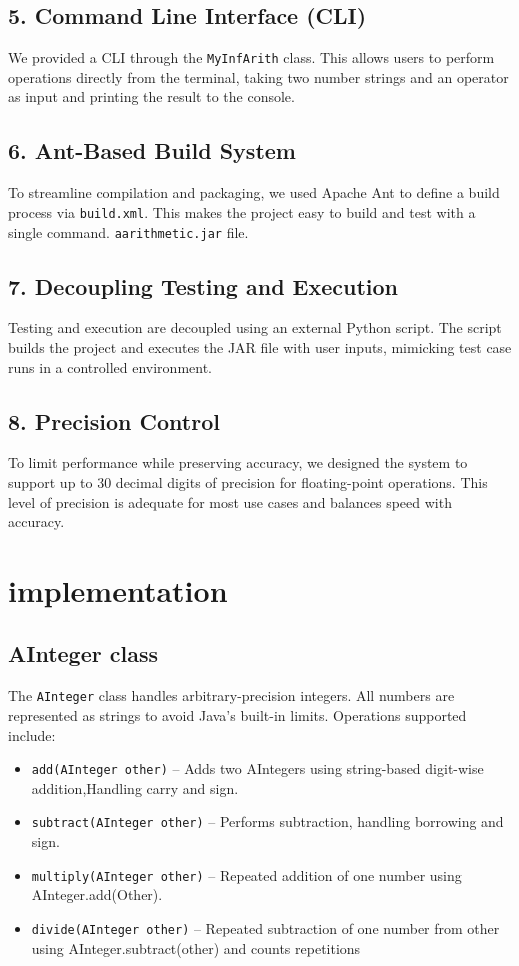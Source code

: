 \documentclass{article}
\begin{document}
\subsection*{5. Command Line Interface (CLI)}
We provided a CLI through the \texttt{MyInfArith} class. This allows users to perform operations directly from the terminal, taking two number strings and an operator as input and printing the result to the console.

\subsection*{6. Ant-Based Build System}
To streamline compilation and packaging, we used Apache Ant to define a build process via \texttt{build.xml}. This makes the project easy to build and test with a single command.
\texttt{aarithmetic.jar} file.

\subsection*{7. Decoupling Testing and Execution}
Testing and execution are decoupled using an external Python script. The script builds the project and executes the JAR file with user inputs, mimicking test case runs in a controlled environment.

\subsection*{8. Precision Control}
To limit performance while preserving accuracy, we designed the system to support up to 30 decimal digits of precision for floating-point operations. This level of precision is adequate for most use cases and balances speed with accuracy.



\section*{implementation}
\subsection*{AInteger class}
The \texttt{AInteger} class handles arbitrary-precision integers. All numbers are represented as strings to avoid Java's built-in limits. Operations supported include:
\begin{itemize}
    \item \texttt{add(AInteger other)} – Adds two AIntegers using string-based digit-wise addition,Handling carry and sign.
    \item \texttt{subtract(AInteger other)} – Performs subtraction, handling borrowing and sign.
    \item \texttt{multiply(AInteger other)} – Repeated addition of one number using AInteger.add(Other).
    \item \texttt{divide(AInteger other)} – Repeated subtraction of one number from other using AInteger.subtract(other) and counts repetitions
\end{itemize}
\end{document}
